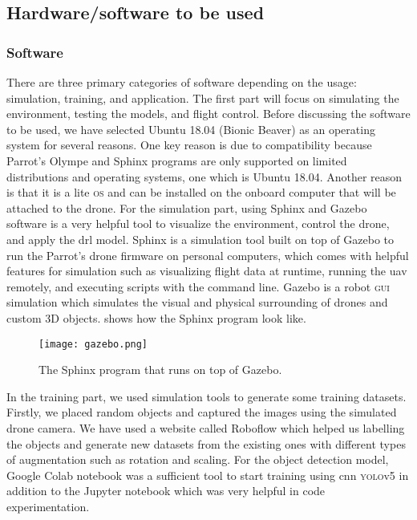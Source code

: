 \documentclass[../main.tex]{subfiles}
\begin{document}
\subsection{Hardware/software to be used}\label{sec:hardware-software}

\subsubsection{Software}
There are three primary categories of software 
depending on the usage: simulation, training, 
and application. The first part will focus on 
simulating the environment, testing the models, 
and flight control. Before discussing the software 
to be used, we have selected Ubuntu 18.04 (Bionic Beaver) 
as an operating system for several reasons. 
One key reason is due to compatibility because 
Parrot's Olympe and Sphinx programs are only 
supported on limited distributions and operating systems,
one which is Ubuntu 18.04. 
Another reason is that it is a lite \textsc{os} 
and can be installed on the onboard computer that 
will be attached to the drone. For the simulation part, 
using Sphinx and Gazebo software is a very helpful tool 
to visualize the environment, control the drone, 
and apply the \gls{drl} model. Sphinx is a simulation 
tool built on top of Gazebo 
to run the Parrot's drone firmware on 
personal computers, which comes with helpful 
features for simulation such as visualizing flight 
data at runtime, running the \gls{uav} remotely, and executing scripts with the command line. 
Gazebo is a robot \textsc{gui} simulation 
which simulates the visual and physical surrounding 
of drones and custom 3D objects. 
 shows how the Sphinx program look like. 

\begin{figure}[H]
    \centering
    \texttt{[image: gazebo.png]}
    \caption{The Sphinx program that runs on top of Gazebo.}
    \label{fig:gazebo}
\end{figure}

In the training part, we used simulation tools to 
generate some training datasets. Firstly, 
we placed random objects and captured the images 
using the simulated drone camera. We have used a 
website called Roboflow which helped us labelling 
the objects and generate new datasets from the 
existing ones with different types of augmentation 
such as rotation and scaling. 
For the object detection model, Google Colab notebook 
was a sufficient tool to start training using 
\gls{cnn} \textsc{yolo}v5 in addition to the 
Jupyter notebook which was very helpful 
in code experimentation. 
\end{document}
